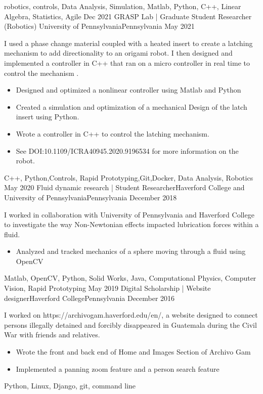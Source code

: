 \begin{experiences}
{\begin{itemize}
 			\end{itemize} 
                 }
                {robotics, controls, Data Analysis, Simulation, Matlab, Python, C++, Linear Algebra, Statistics, Agile}   
 \experience
    {Dec 2021}     {GRASP Lab | Graduate Student Researcher (Robotics)  }{ University of Pennsylvania}{Pennsylvania}
    {May 2021}    {
 I used a phase change material coupled with a heated insert to create a latching mechanism to add directionality to an origami robot. I then designed and implemented a controller in C++ that ran on a micro controller in real time to control the mechanism .
                      \begin{itemize}
			\item Designed and optimized a nonlinear controller using Matlab and Python 
			\item Created a simulation and optimization of a mechanical Design  of the latch insert using Python.
			\item Wrote a controller in C++ to control the latching mechanism.
			\item  See DOI:10.1109/ICRA40945.2020.9196534 for more information on the robot.
                      \end{itemize}
                    }
                    {C++, Python,Controls, Rapid Prototyping,Git,Docker, Data Analysis, Robotics}
  \experience
    {May 2020}   {Fluid dynamic research | Student Researcher}{Haverford College and University of Pennsylvania}{Pennsylvania}
    {December 2018} {
  I worked in collaboration with University of Pennsylvania and Haverford College to investigate the way Non-Newtonian effects impacted lubrication forces within a fluid.
                      \begin{itemize}
                        \item Analyzed and tracked mechanics of a sphere moving through a fluid using OpenCV 
                      \end{itemize}
                    }
                    {Matlab, OpenCV, Python, Solid Works, Java, Computational Physics, Computer Vision, Rapid Prototyping}
  \experience
    {May 2019}   {Digital Scholarship | Website designer}{Haverford College}{Pennsylvania}
    {December 2016} {
    I worked on https://archivogam.haverford.edu/en/, a website designed to connect persons illegally detained and forcibly disappeared in Guatemala during the Civil War with friends and relatives.
                      \begin{itemize}
                       \item Wrote the front and back end of Home and Images Section of Archivo Gam 
		     \item Implemented a panning zoom feature and a person search feature
                      \end{itemize}
                    }
                    {Python, Linux, Django, git, command line }

 
 

\end{experiences}
